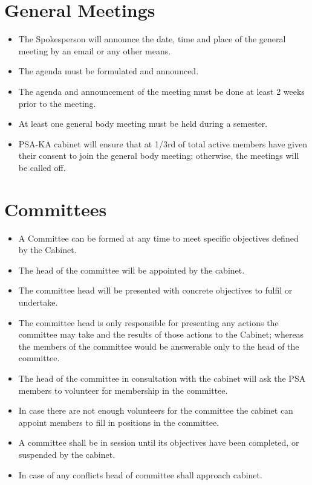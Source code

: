 \section{General Meetings }
\begin{itemize}
	\item The Spokesperson will announce the date, time and place of the general meeting by an email or any other means. 
	\item The agenda must be formulated and announced. 
	\item The agenda and announcement of the meeting must be done at least 2 weeks prior to the meeting. 
	\item At least one general body meeting must be held during a semester. 
	\item PSA-KA cabinet will ensure that at 1/3rd of total active members have given their consent to join the general body meeting; otherwise, the meetings will be called off. 
\end{itemize}
\section{Committees }
\begin{itemize}
	\item A Committee can be formed at any time to meet specific objectives defined by the Cabinet. 
	\item The head of the committee will be appointed by the cabinet. 
	\item The committee head will be presented with concrete objectives to fulfil or undertake. 
	\item The committee head is only responsible for presenting any actions the committee may take and the results of those actions to the Cabinet; whereas the members of the committee would be answerable only to the head of the committee. 
	\item The head of the committee in consultation with the cabinet will ask the PSA members to volunteer for membership in the committee. 
	\item In case there are not enough volunteers for the committee the cabinet can appoint members to fill in positions in the committee. 
	\item A committee shall be in session until its objectives have been completed, or suspended by the cabinet. 
	\item In case of any conflicts head of committee shall approach cabinet. 
\end{itemize}
